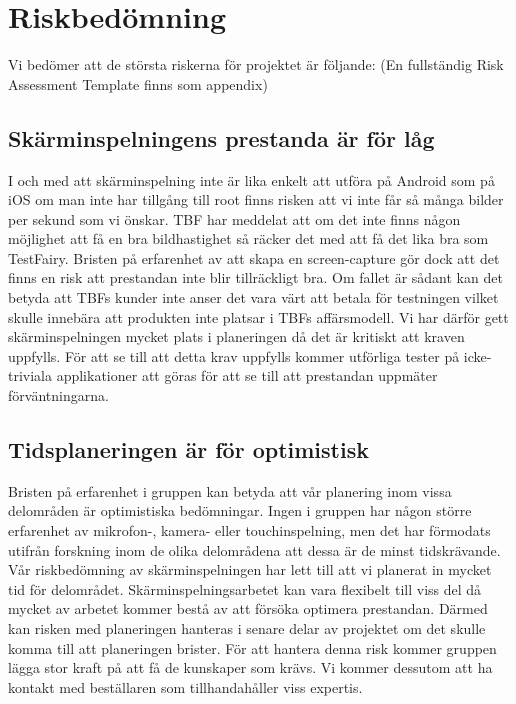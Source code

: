 \section{Riskbedömning}

Vi bedömer att de största riskerna för projektet är följande:
(En fullständig Risk Assessment Template finns som appendix)

\subsection{Skärminspelningens prestanda är för låg}
\label{subsec:screenrec}
I och med att skärminspelning inte är lika enkelt att utföra på Android som på iOS om man inte har tillgång till root finns risken att vi inte får så många bilder per sekund som vi önskar. TBF har meddelat att om det inte finns någon möjlighet att få en bra bildhastighet så räcker det med att få det lika bra som TestFairy. Bristen på erfarenhet av att skapa en screen-capture gör dock att det finns en risk att prestandan inte blir tillräckligt bra. Om fallet är sådant kan det betyda att TBFs kunder inte anser det vara värt att betala för testningen vilket skulle innebära att produkten inte platsar i TBFs affärsmodell. Vi har därför gett skärminspelningen mycket plats i planeringen då det är kritiskt att kraven uppfylls. För att se till att detta krav uppfylls kommer utförliga tester på icke-triviala applikationer att göras för att se till att prestandan uppmäter förväntningarna.

\subsection{Tidsplaneringen är för optimistisk}
Bristen på erfarenhet i gruppen kan betyda att vår planering inom vissa delområden är optimistiska bedömningar. Ingen i gruppen har någon större erfarenhet av mikrofon-, kamera- eller touchinspelning, men det har förmodats utifrån forskning inom de olika delområdena att dessa är de minst tidskrävande. Vår riskbedömning av skärminspelningen har lett till att vi planerat in mycket tid för delområdet. Skärminspelningsarbetet kan vara flexibelt till viss del då mycket av arbetet kommer bestå av att försöka optimera prestandan. Därmed kan risken med planeringen hanteras i senare delar av projektet om det skulle komma till att planeringen brister. För att hantera denna risk kommer gruppen lägga stor kraft på att få de kunskaper som krävs. Vi kommer dessutom att ha kontakt med beställaren som tillhandahåller viss expertis.

